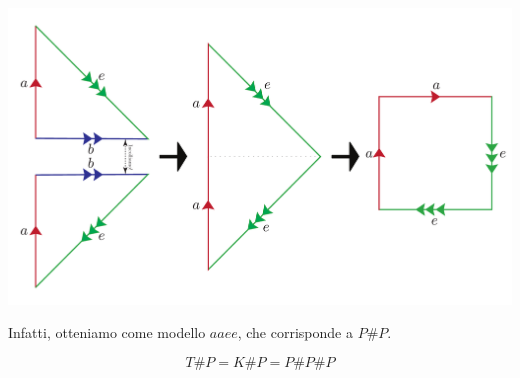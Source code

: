 \begin{observe}
\begin{center}
	\includegraphics[trim=0cm 0cm 0cm 0cm, clip, scale=0.3]{images/kleintoprojdouble2.pdf}
\end{center}
\vspace{-3mm}
Infatti, otteniamo come modello $aaee$, che corrisponde a $P\# P$.
\end{observe}
\begin{lemming}
	\begin{equation}
		T\# P= K\# P=P\# P\# P
	\end{equation}
\vspace{-6mm}
\end{lemming}
